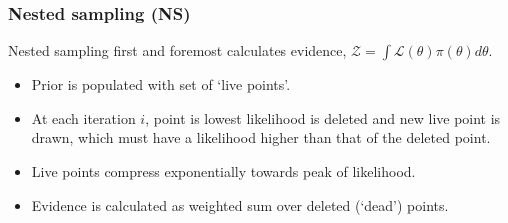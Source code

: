 \documentclass[aspectratio=169]{beamer}
\begin{document}
\begin{frame}
\frametitle{Nested sampling (NS)}\vfill
Nested sampling first and foremost calculates evidence, $\mathcal{Z} = \int \mathcal{L(\theta)} \pi(\theta) d\theta$.
\begin{minipage}[]{0.35\textwidth}
\vspace{20em}
\vspace{-5em}
\end{minipage}\hfill
\begin{minipage}{0.5\textwidth}
    \begin{itemize}
        \item<1-> Prior is populated with set of `live points'.
        \item<2-> At each iteration $i$, point is lowest likelihood is deleted and new live point is drawn, which must have a likelihood higher than that of the deleted point.
        \item<4-> Live points compress exponentially towards peak of likelihood.
        \item<5-> Evidence is calculated as weighted sum over deleted (`dead') points.
    \end{itemize}
\end{minipage}
\end{frame}

\end{document}
